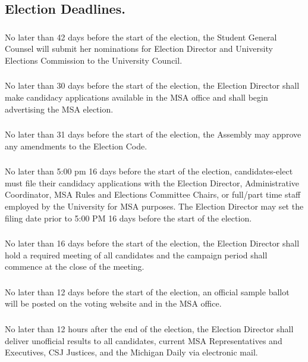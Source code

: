 \subsection{Election Deadlines.}
\subsubsection{}
No later than 42 days before the start of the election, the Student General Counsel will submit her nominations for Election Director and University Elections Commission to the University Council.
\subsubsection{}
No later than 30 days before the start of the election, the Election Director shall make candidacy applications available in the MSA office and shall begin advertising the MSA election.
\subsubsection{}
No later than 31 days before the start of the election, the Assembly may approve any amendments to the Election Code.
\subsubsection{}
No later than 5:00 pm 16 days before the start of the election, candidates-elect must file their candidacy applications with the Election Director, Administrative Coordinator, MSA Rules and Elections Committee Chairs, or full/part time staff employed by the University for MSA purposes. The Election Director may set the filing date prior to 5:00 PM 16 days before the start of the election.
\subsubsection{}
No later than 16 days before the start of the election, the Election Director shall hold a required meeting of all candidates and the campaign period shall commence at the close of the meeting.
\subsubsection{}
No later than 12 days before the start of the election, an official sample ballot will be posted on the voting website and in the MSA office.
\subsubsection{}
No later than 12 hours after the end of the election, the Election Director shall deliver unofficial results to all candidates, current MSA Representatives and Executives, CSJ Justices, and the Michigan Daily via electronic mail.
